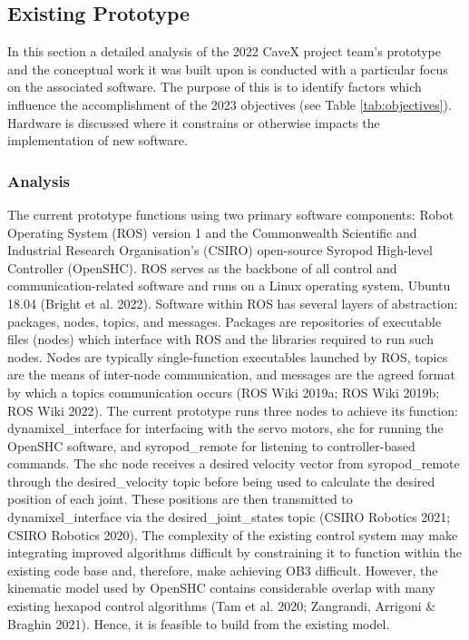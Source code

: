 \subsection{Existing Prototype}
\label{subsec:existing-prototype}
In this section a detailed analysis of the 2022 CaveX project team's prototype and the conceptual work it was built upon is conducted with a particular focus on the associated software. The purpose of this is to identify factors which influence the accomplishment of the 2023 objectives (see Table \ref{tab:objectives}). Hardware is discussed where it constrains or otherwise impacts the implementation of new software.

\subsubsection{Analysis}
The current prototype functions using two primary software components: Robot Operating System (ROS) version 1 and the Commonwealth Scientific and Industrial Research Organisation's (CSIRO) open-source Syropod High-level Controller (OpenSHC). ROS serves as the backbone of all control and communication-related software and runs on a Linux operating system, Ubuntu 18.04 (Bright et al. 2022). Software within ROS has several layers of abstraction: packages, nodes, topics, and messages. Packages are repositories of executable files (nodes) which interface with ROS and the libraries required to run such nodes. Nodes are typically single-function executables launched by ROS, topics are the means of inter-node communication, and messages are the agreed format by which a topics communication occurs (ROS Wiki 2019a; ROS Wiki 2019b; ROS Wiki 2022). The current prototype runs three nodes to achieve its function: dynamixel\_interface  for interfacing with the servo motors, shc for running the OpenSHC software, and syropod\_remote for listening to controller-based commands. The shc node receives a desired velocity vector from syropod\_remote through the desired\_velocity topic before being used to calculate the desired position of each joint. These positions are then transmitted to dynamixel\_interface via the desired\_joint\_states topic (CSIRO Robotics 2021; CSIRO Robotics 2020). The complexity of the existing control system may make integrating improved algorithms difficult by constraining it to function within the existing code base and, therefore, make achieving OB3 difficult. However, the kinematic model used by OpenSHC contains considerable overlap with many existing hexapod control algorithms (Tam et al. 2020; Zangrandi, Arrigoni \& Braghin 2021). Hence, it is feasible to build from the existing model. 

